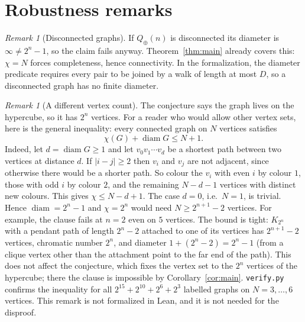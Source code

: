 \documentclass[11pt]{article}
\theoremstyle{definition}
\theoremstyle{remark}
\newtheorem{remark}[theorem]{Remark}
\begin{document}
\section{Robustness remarks}
\begin{remark}[Disconnected graphs]
If $Q_\oplus(n)$ is disconnected its diameter is $\infty\ne2^n-1$, so the claim
fails anyway. Theorem~\ref{thm:main} already covers this: $\chi=N$ forces
completeness, hence connectivity. In the formalization, the diameter predicate
requires every pair to be joined by a walk of length at most $D$, so a
disconnected graph has no finite diameter.
\end{remark}

\begin{remark}[A different vertex count]\label{rem:count}
The conjecture says the graph lives on the hypercube, so it has $2^n$
vertices. For a reader who would allow other vertex sets, here is the general
inequality: every connected graph on $N$ vertices satisfies
\[
\chi(G)+\operatorname{diam}G\le N+1 .
\]
Indeed, let $d=\operatorname{diam}G\ge1$ and let $v_0v_1\cdots v_d$ be a
shortest path between two vertices at distance $d$. If $|i-j|\ge2$ then $v_i$
and $v_j$ are not adjacent, since otherwise there would be a shorter path. So
colour the $v_i$ with even $i$ by colour $1$, those with odd $i$ by colour $2$,
and the remaining $N-d-1$ vertices with distinct new colours. This gives
$\chi\le N-d+1$. The case $d=0$, i.e.\ $N=1$, is trivial. Hence
$\operatorname{diam}=2^n-1$ and $\chi=2^n$ would need $N\ge2^{n+1}-2$
vertices. For example, the clause fails at $n=2$ even on $5$ vertices.
The bound is tight: $K_{2^n}$ with a pendant path of length $2^n-2$ attached
to one of its vertices has $2^{n+1}-2$ vertices, chromatic number $2^n$, and
diameter $1+(2^n-2)=2^n-1$ (from a clique vertex other than the attachment
point to the far end of the path). This does not affect the conjecture, which
fixes the vertex set to the $2^n$ vertices of the hypercube; there the clause
is impossible by Corollary~\ref{cor:main}.
\texttt{verify.py} confirms the inequality for all $2^{15}+2^{10}+2^6+2^3$
labelled graphs on $N=3,\dots,6$ vertices. This remark is not formalized in
Lean, and it is not needed for the disproof.
\end{remark}
\end{document}
